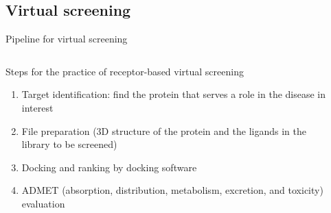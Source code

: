 \subsection{Virtual screening}
\begin{frame}{Pipeline for virtual screening}
   \begin{columns}
    \begin{column}{0.45\textwidth}
    \begin{block}{Steps for the practice of receptor-based virtual screening}
    \begin{enumerate}
      \item Target identification: find the protein that serves a role in the disease in interest
      \item File preparation (3D structure of the protein and the ligands in the library to be screened)
      \item Docking and ranking by docking software
      \item ADMET (absorption, distribution, metabolism, excretion, and toxicity) evaluation
    \end{enumerate}
    \end{block}
    \end{column}   
    \begin{column}{0.4\textwidth}
        \hfill

\end{column}
\end{columns}
\end{frame}
